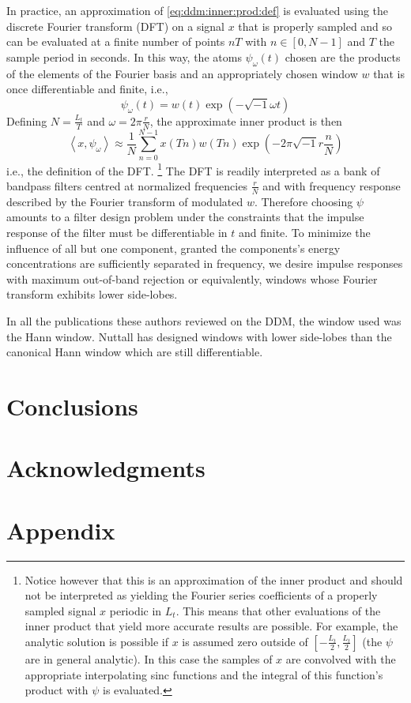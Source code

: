 \documentclass[twoside,a4paper]{article}
\begin{document}
In practice, an approximation of \ref{eq:ddm:inner:prod:def} is evaluated using
the discrete Fourier transform (DFT) on a signal $x$ that is properly sampled
and so can be evaluated at a finite number of points $nT$ with $n \in [0,N-1]$ and
$T$ the sample period in seconds. In this way, the atoms $\psi_{\omega}(t)$ chosen
are the products of the elements of the Fourier basis and an appropriately
chosen window $w$ that is once differentiable and finite, i.e.,
%
\[
    \psi_{\omega}(t) = w(t) \exp(-\sqrt{-1} \omega t)
\]
%
Defining $N = \frac{L_{t}}{T}$ and $\omega = 2
\pi \frac{r}{N}$, the approximate
inner product is then
%
\[
    \left\langle x , \psi_{\omega} \right\rangle \approx 
    \frac{1}{N} \sum_{n=0}^{N-1} x(Tn) w(Tn) \exp(-2 \pi \sqrt{-1} r \frac{n}{N}) 
\]
%
i.e., the definition of the DFT.%
\footnote{%
    Notice however that this is an approximation of the inner product and should
    not be interpreted as yielding the Fourier series coefficients of a properly
    sampled signal $x$ periodic in $L_{t}$. This means that other
    evaluations of the inner product that yield more accurate results are
    possible. For example, the analytic solution is possible if $x$ is assumed
    zero outside of $[-\frac{L_{t}}{2},\frac{L_{t}}{2}]$ (the $\psi$ are in
    general analytic).  In this case the samples of $x$ are convolved with the
    appropriate interpolating sinc functions and the integral of this function's
    product with $\psi$ is evaluated.
}%
The DFT is readily interpreted as a bank of bandpass filters centred at
normalized frequencies $\frac{r}{N}$ and with frequency response described by
the Fourier transform of modulated $w$. Therefore choosing $\psi$ amounts to a
filter design problem under the constraints that the impulse response of the
filter must be differentiable in $t$ and finite. To minimize the influence of
all but one component, granted the components's energy concentrations are
sufficiently separated in frequency, we desire impulse responses with maximum
out-of-band rejection or equivalently, windows whose Fourier transform exhibits
lower side-lobes.

In all the publications these authors reviewed on the DDM, the window used was
the Hann window.
Nuttall has designed windows with lower
side-lobes than the canonical Hann window which are still differentiable.

\section{Conclusions}

\section{Acknowledgments}

\nocite{*}


\section{Appendix}
\end{document}
